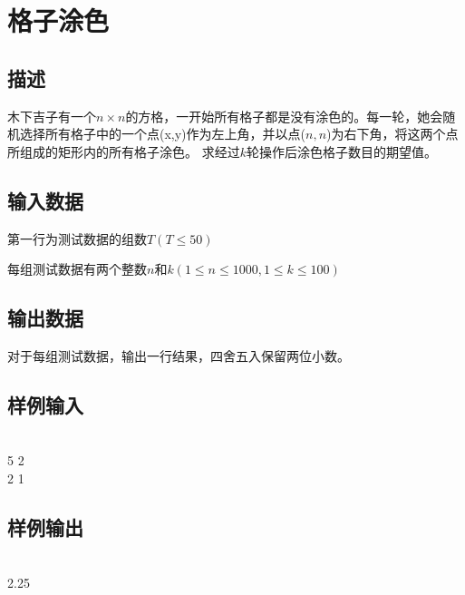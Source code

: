 \ifx\allfiles\undefined

\fi


\section{格子涂色}
\subsection*{描述}
木下吉子有一个$n\times n$的方格，一开始所有格子都是没有涂色的。每一轮，她会随机选择所有格子中的一个点(x,y)作为左上角，并以点($n,n$)为右下角，将这两个点所组成的矩形内的所有格子涂色。
求经过$k$轮操作后涂色格子数目的期望值。


\subsection*{输入数据}
第一行为测试数据的组数$T(T\leqslant 50)$

每组测试数据有两个整数$n$和$k(1\leqslant n\leqslant 1000,1\leqslant k\leqslant 100)$

\subsection*{输出数据}
对于每组测试数据，输出一行结果，四舍五入保留两位小数。

\subsection*{样例输入}
\\
5 2\\
2 1

\subsection*{样例输出}
\\
2.25


\ifx\allfiles\undefined

\fi